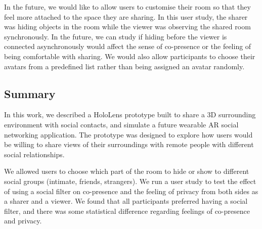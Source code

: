 In the future, we would like to allow users to customise their room so that they feel more attached to the space they are sharing. In this user study, the sharer was hiding objects in the room while the viewer was observing the shared room synchronously. In the future, we can study if hiding before the viewer is connected asynchronously would affect the sense of co-presence or the feeling of being comfortable with sharing. We would also allow participants to choose their avatars from a predefined list rather than being assigned an avatar randomly.   

\subsection{Summary}

In this work, we described a HoloLens prototype built to share a 3D surrounding environment with social contacts, and simulate a future wearable AR social networking application. The prototype was designed to explore how users would be willing to share views of their surroundings with remote people with different social relationships. 

We allowed users to choose which part of the room to hide or show to different social groups (intimate, friends, strangers). We run a user study to test the effect of using a social filter on co-presence and the feeling of privacy from both sides as a sharer and a viewer. We found that all participants preferred having a social filter, and there was some statistical difference regarding feelings of co-presence and privacy. 

